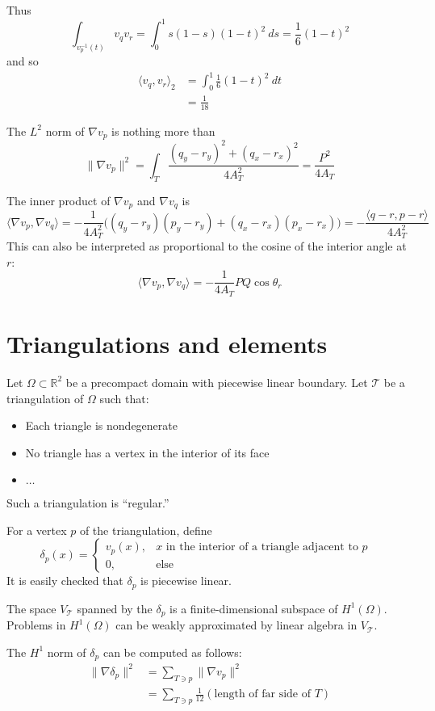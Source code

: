 \documentclass[12pt]{amsart}
\begin{document}
Thus
\[ \int_{v_p^{-1}(t)} v_qv_r = \int_0^1 s(1-s)(1-t)^2\ ds = \frac{1}{6}(1-t)^2 \]
and so
\begin{align*}
\langle v_q, v_r\rangle_2 &= \int_0^1 \frac{1}{6}(1-t)^2\ dt \\
	&= \frac{1}{18}
\end{align*}

The $L^2$ norm of $\nabla v_p$ is nothing more than
\[\|\nabla v_p \|^2 = \int_T\frac{(q_y - r_y)^2 + (q_x - r_x)^2}{4A_T^2} = \frac{P^2}{4A_T} \]

The inner product of $\nabla v_p$ and $\nabla v_q$ is
\[ \langle \nabla v_p, \nabla v_q \rangle = -\frac{1}{4A_T^2}\bigg( (q_y - r_y)(p_y - r_y) + (q_x - r_x)(p_x - r_x)\bigg) = -\frac{\langle q-r, p-r\rangle}{4A_T^2} \]
This can also be interpreted as proportional to the cosine of the interior angle at $r$:
\[ \langle \nabla v_p, \nabla v_q\rangle = -\frac{1}{4A_T}PQ\cos\theta_r\]

\section*{Triangulations and elements}

Let $\Omega\subset\mathbb{R}^2$ be a precompact domain with piecewise linear boundary. Let $\mathcal{T}$ be a triangulation of $\Omega$ such that:
\begin{itemize}
\item Each triangle is nondegenerate
\item No triangle has a vertex in the interior of its face
\item $\ldots$
\end{itemize}
Such a triangulation is ``regular.''

For a vertex $p$ of the triangulation, define
\[
\delta_p(x) = \begin{cases}
v_p(x), & x \mbox{ in the interior of a triangle adjacent to $p$ } \\
0, & \mbox{else}
\end{cases}
\]
It is easily checked that $\delta_p$ is piecewise linear.

The space $V_\mathcal{T}$ spanned by the $\delta_p$ is a finite-dimensional subspace of $H^1(\Omega)$. Problems in $H^1(\Omega)$ can be weakly approximated by linear algebra in $V_\mathcal{T}$.

The $H^1$ norm of $\delta_p$ can be computed as follows:
\begin{align*}
\| \nabla \delta_p \|^2 &= \sum_{T\ni p} \| \nabla v_p \|^2 \\
	&= \sum_{T\ni p} \frac{1}{12}(\mbox{length of far side of $T$})
\end{align*}
\end{document}
